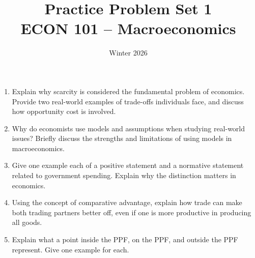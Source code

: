 \documentclass[12pt]{article}
\title{Practice Problem Set 1\\ \vspace{15pt} \large ECON 101 -- Macroeconomics}
\author{}
\date{Winter 2026}
\begin{document}
\maketitle



\begin{enumerate}
  \item 
  Explain why scarcity is considered the fundamental problem of economics. Provide two real-world examples of trade-offs individuals face, and discuss how opportunity cost is involved.

  \item 
  Why do economists use models and assumptions when studying real-world issues? Briefly discuss the strengths and limitations of using models in macroeconomics.

  \item
  Give one example each of a positive statement and a normative statement related to government spending. Explain why the distinction matters in economics.

  \item
  Using the concept of comparative advantage, explain how trade can make both trading partners better off, even if one is more productive in producing all goods.

  \item
  Explain what a point inside the PPF, on the PPF, and outside the PPF represent. Give one example for each.
\end{enumerate}
\end{document}
